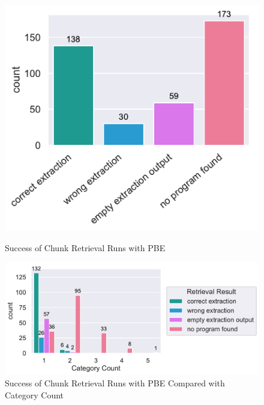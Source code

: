 \documentclass[\myrootdir/main.tex]{subfiles}
\begin{document}
\begin{figure}[htbp]
	\centering
	\begin{minipage}{0.45\textwidth}
		\centering
		\includegraphics[width=\textwidth, clip]{img/big-study/failure-reason-PBE.pdf}
		\caption{Success of Chunk Retrieval Runs with PBE}
		\label{fig:failure-reason-PBE}
	\end{minipage}\hfill
	\begin{minipage}{0.45\textwidth}
		\centering
		\includegraphics[width=\textwidth, clip]{img/big-study/failure-reason-categorycount-PBE.pdf}
		\caption{Success of Chunk Retrieval Runs with PBE Compared with Category Count}
		\label{fig:failure-reason-categorycount-PBE}
	\end{minipage}
\end{figure}
\end{document}
